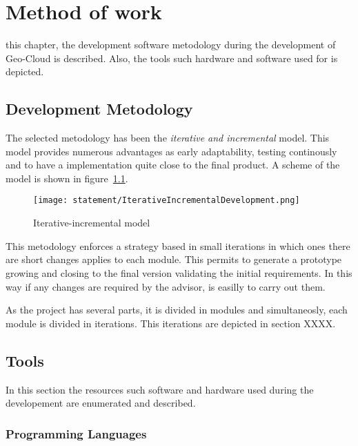 \chapter{Method of work}
\label{chap:method}
 this chapter, the development software metodology during the
development of Geo-Cloud is described. Also, the tools such hardware and software used for is depicted.
 
\section{Development Metodology}
The selected metodology has been the \emph{iterative and incremental}
model. This model provides numerous advantages as early adaptability, testing
continously and to have a implementation quite close to the final product. A
scheme of the model is shown in figure~\ref{fig:IncrementalModel}.


\begin{figure}[!h]
\begin{center}
\texttt{[image: statement/IterativeIncrementalDevelopment.png]}
\caption{Iterative-incremental model}
\label{fig:IncrementalModel}
\end{center}
\end{figure}

This metodology enforces a strategy based in small iterations in which ones
there are short changes applies to each module. This permits to generate a prototype
growing and closing to the final version validating the initial requirements. In
this way if any changes are required by the advisor, is easilly to carry out
them.
 
As the project has several parts, it is divided in modules and simultaneosly,
each module is divided in iterations. This iterations are depicted in section XXXX.

\section{Tools}

In this section the resources such software and hardware used during the
developement are enumerated and described.  



\subsection{Programming Languages}

